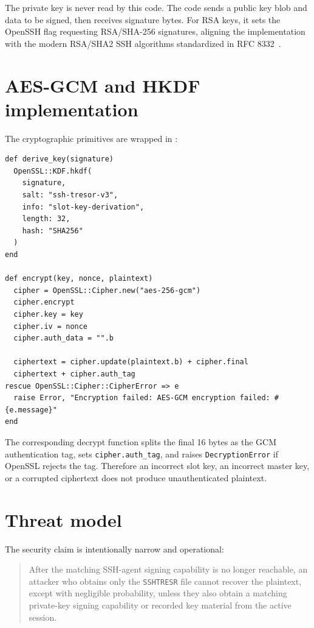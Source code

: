 \documentclass[11pt]{article}
\theoremstyle{definition}
\theoremstyle{plain}
\newcommand{\Tresor}{\texttt{SSHTRESR}}
\begin{document}
The private key is never read by this code. The code sends a public key blob and data to be signed, then receives signature bytes. For RSA keys, it sets the OpenSSH flag requesting RSA/SHA-256 signatures, aligning the implementation with the modern RSA/SHA2 SSH algorithms standardized in RFC 8332~\cite{rfc8332}.

\section{AES-GCM and HKDF implementation}

The cryptographic primitives are wrapped in :

\begin{lstlisting}[style=rubycode,caption={Key derivation and AES-GCM from lib/ssh\_tresor/crypto.rb.}]
def derive_key(signature)
  OpenSSL::KDF.hkdf(
    signature,
    salt: "ssh-tresor-v3",
    info: "slot-key-derivation",
    length: 32,
    hash: "SHA256"
  )
end

def encrypt(key, nonce, plaintext)
  cipher = OpenSSL::Cipher.new("aes-256-gcm")
  cipher.encrypt
  cipher.key = key
  cipher.iv = nonce
  cipher.auth_data = "".b

  ciphertext = cipher.update(plaintext.b) + cipher.final
  ciphertext + cipher.auth_tag
rescue OpenSSL::Cipher::CipherError => e
  raise Error, "Encryption failed: AES-GCM encryption failed: #{e.message}"
end
\end{lstlisting}

The corresponding decrypt function splits the final 16 bytes as the GCM authentication tag, sets \texttt{cipher.auth\_tag}, and raises \texttt{DecryptionError} if OpenSSL rejects the tag. Therefore an incorrect slot key, an incorrect master key, or a corrupted ciphertext does not produce unauthenticated plaintext.

\section{Threat model}
\label{sec:threat-model}

The security claim is intentionally narrow and operational:

\begin{quote}
After the matching SSH-agent signing capability is no longer reachable, an attacker who obtains only the \Tresor{} file cannot recover the plaintext, except with negligible probability, unless they also obtain a matching private-key signing capability or recorded key material from the active session.
\end{quote}
\end{document}
